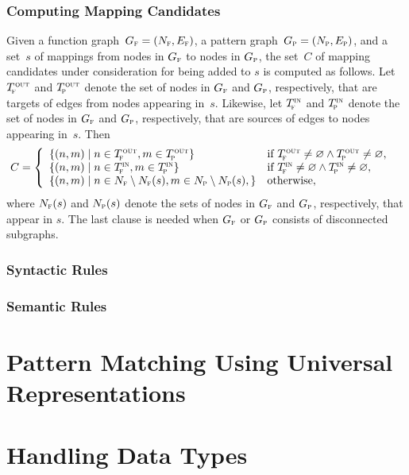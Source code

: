 \subsubsection{Computing Mapping Candidates}

Given a \gls{function graph}~\mbox{$\fG = \mPair{\fN}{\fE}$}, a \gls{pattern
  graph}~\mbox{$\pG = \mPair{\pN}{\pE}$}, and a set~$s$ of mappings from
\glspl{node} in $G_{\textrm{\textsc{f}}}$ to \glspl{node} in $G_{\textrm{\textsc{p}}}$, the set~$C$ of mapping
candidates under consideration for being added to $s$ is computed as follows.
%
Let $T_{\!\textrm{\textsc{f}}}^{\hspace{.5pt}\textrm{\textsc{out}}}$ and $T_{\!\textrm{\textsc{p}}}^{\hspace{.5pt}\textrm{\textsc{out}}}$ denote the set of \glspl{node} in $G_{\textrm{\textsc{f}}}$ and $G_{\textrm{\textsc{p}}}$,
respectively, that are targets of \glspl{edge} from \glspl{node} appearing
in~$s$.
%
Likewise, let $T_{\!\textrm{\textsc{f}}}^{\textrm{\textsc{in}}}$ and $T_{\!\textrm{\textsc{p}}}^{\textrm{\textsc{in}}}$ denote the set of \glspl{node} in $G_{\textrm{\textsc{f}}}$ and
$G_{\textrm{\textsc{p}}}$, respectively, that are sources of \glspl{edge} to \glspl{node} appearing
in~$s$.
%
Then
%
\begin{equation}
  \hspace*{-.8em}
  C = \left\{
  \begin{array}{ll}
      \mSetBuilder{\mPair{n}{m}}{n \in \fTout, m \in \pTout}
    & \text{if} \ \fTout \neq \emptyset \mAnd \pTout \neq \emptyset, \\
      \mSetBuilder{\mPair{n}{m}}{n \in \fTin, m \in \pTin}
    & \text{if} \ \fTin \neq \emptyset \mAnd \pTin \neq \emptyset, \\
      \mSetBuilder{\mPair{n}{m}}{
                                  n \in \fN \setminus \fN(s),
                                  m \in \pN \setminus \pN(s),
                                }
    & \text{otherwise},
  \end{array}
 \right.
\end{equation}
%
where $N_{\textrm{\textsc{f}}}(s)$ and $N_{\textrm{\textsc{p}}}(s)$ denote the sets of \glspl{node} in $G_{\textrm{\textsc{f}}}$ and $G_{\textrm{\textsc{p}}}$,
respectively, that appear in $s$.
%
The last clause is needed when $G_{\textrm{\textsc{f}}}$ or $G_{\textrm{\textsc{p}}}$ consists of disconnected
\glspl{subgraph}.



\subsubsection{Syntactic Rules}




\subsubsection{Semantic Rules}




\section{Pattern Matching Using Universal Representations}





\section{Handling Data Types}

